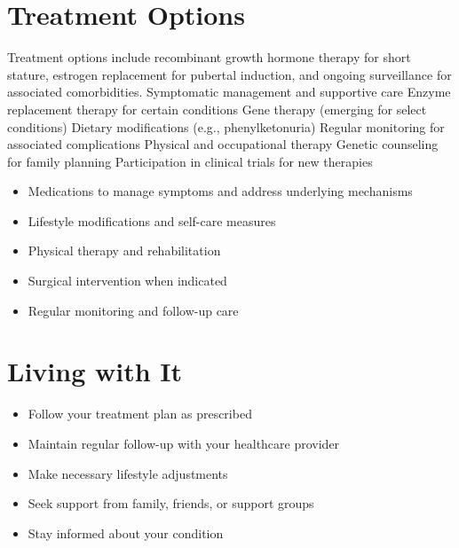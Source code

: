 \section{Treatment Options}
Treatment options include recombinant growth hormone therapy for short stature, estrogen replacement for pubertal induction, and ongoing surveillance for associated comorbidities. Symptomatic management and supportive care Enzyme replacement therapy for certain conditions Gene therapy (emerging for select conditions) Dietary modifications (e.g., phenylketonuria) Regular monitoring for associated complications Physical and occupational therapy Genetic counseling for family planning Participation in clinical trials for new therapies

\begin{itemize}[noitemsep]
  \item Medications to manage symptoms and address underlying mechanisms
  \item Lifestyle modifications and self-care measures
  \item Physical therapy and rehabilitation
  \item Surgical intervention when indicated
  \item Regular monitoring and follow-up care
\end{itemize}
\section{Living with It}
\begin{itemize}[noitemsep]
  \item Follow your treatment plan as prescribed
  \item Maintain regular follow-up with your healthcare provider
  \item Make necessary lifestyle adjustments
  \item Seek support from family, friends, or support groups
  \item Stay informed about your condition
\end{itemize}
